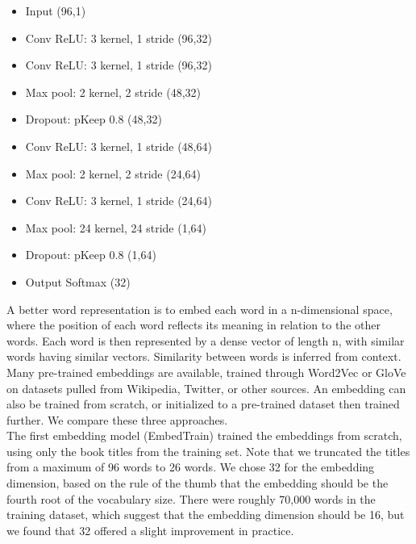 \documentclass[jou,apacite, 10px]{apa6}
\begin{document}
\begin{itemize}
    \item Input (96,1)
    \item Conv ReLU: 3 kernel, 1 stride (96,32)
    \item Conv ReLU: 3 kernel, 1 stride (96,32)
    \item Max pool: 2 kernel, 2 stride (48,32)
    \item Dropout: pKeep 0.8 (48,32)
    \item Conv ReLU: 3 kernel, 1 stride (48,64)
    \item Max pool: 2 kernel, 2 stride (24,64)
    \item Conv ReLU: 3 kernel, 1 stride (24,64)
    \item Max pool: 24 kernel, 24 stride (1,64)
    \item Dropout: pKeep 0.8 (1,64)
    \item Output Softmax (32)
\end{itemize}\rule{0pt}{4ex}
A better word representation is to embed each word in a n-dimensional space, where the position of each word reflects its meaning in relation to the other words. Each word is then represented by a dense vector of length n, with similar words having similar vectors. Similarity between words is inferred from context. Many pre-trained embeddings are available, trained through Word2Vec or GloVe on datasets pulled from Wikipedia, Twitter, or other sources. An embedding can also be trained from scratch, or initialized to a pre-trained dataset then trained further. We compare these three approaches.\\
The first embedding model (EmbedTrain) trained the embeddings from scratch, using only the book titles from the training set. Note that we truncated the titles from a maximum of 96 words to 26 words. We chose 32 for the embedding dimension, based on the rule of the thumb that the embedding should be the fourth root of the vocabulary size. There were roughly 70,000 words in the training dataset, which suggest that the embedding dimension should be 16, but we found that 32 offered a slight improvement in practice.
\end{document}
